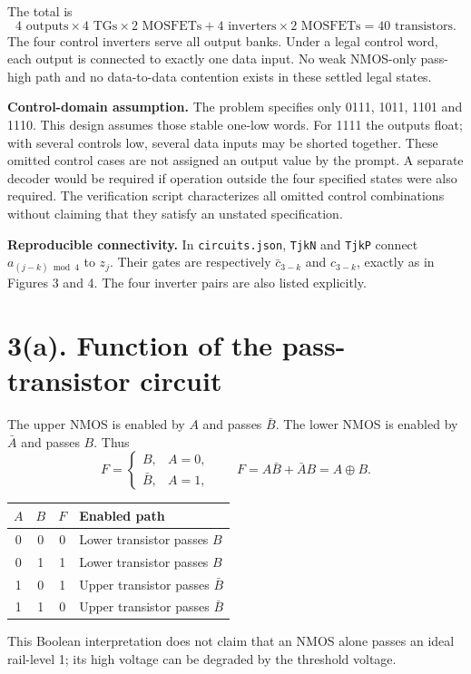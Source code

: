 \documentclass[11pt,a4paper]{article}
\begin{document}
The total is
\[
 4\text{ outputs}\times4\text{ TGs}\times2\text{ MOSFETs}
 +4\text{ inverters}\times2\text{ MOSFETs}
 =\boxed{40\text{ transistors}.}
\]
The four control inverters serve all output banks. Under a legal control word,
each output is connected to exactly one data input. No weak NMOS-only pass-high
path and no data-to-data contention exists in these settled legal states.

\textbf{Control-domain assumption.} The problem specifies only 0111, 1011,
1101 and 1110. This design assumes those stable one-low words. For 1111 the
outputs float; with several controls low, several data inputs may be shorted
together. These omitted control cases are not assigned an output value by the
prompt. A separate decoder would be required if operation outside the four
specified states were also required. The verification script characterizes
all omitted control combinations without claiming that they satisfy an
unstated specification.

\textbf{Reproducible connectivity.} In \texttt{circuits.json},
\texttt{TjkN} and \texttt{TjkP} connect $a_{(j-k)\bmod4}$ to $z_j$.
Their gates are respectively $\bar c_{3-k}$ and $c_{3-k}$, exactly as in
Figures 3 and 4. The four inverter pairs are also listed explicitly.

\newpage
\section*{3(a). Function of the pass-transistor circuit}
The upper NMOS is enabled by $A$ and passes $\bar B$. The lower NMOS is
enabled by $\bar A$ and passes $B$. Thus
\[
 F=\begin{cases}B,&A=0,\\\bar B,&A=1,\end{cases}
 \qquad\boxed{F=A\bar B+\bar AB=A\oplus B.}
\]
\begin{center}
\begin{tabular}{cccl}\toprule
$A$&$B$&$F$&Enabled path\\\midrule
0&0&0&Lower transistor passes $B$\\
0&1&1&Lower transistor passes $B$\\
1&0&1&Upper transistor passes $\bar B$\\
1&1&0&Upper transistor passes $\bar B$\\\bottomrule
\end{tabular}
\end{center}
This Boolean interpretation does not claim that an NMOS alone passes an
ideal rail-level 1; its high voltage can be degraded by the threshold voltage.
\end{document}
